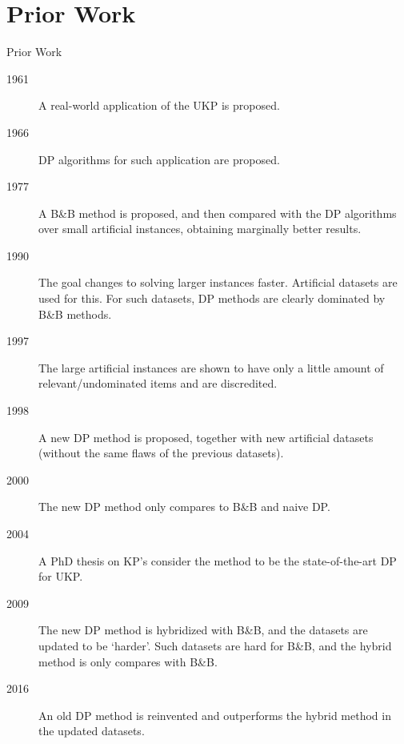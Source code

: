 \documentclass{beamer}
\begin{document}
\section{Prior Work}
\begin{frame}[allowframebreaks]{Prior Work}
\begin{description}
\item[1961] A real-world application of the UKP is proposed.\cite{gg-61} %
\item[1966] DP algorithms for such application are proposed.\cite{gg-66} %
\item[1977] A B\&B method is proposed, and then compared with the DP algorithms over small artificial instances, obtaining marginally better results.\cite{mtu1} %
\item[1990] The goal changes to solving larger instances faster. Artificial datasets are used for this. For such datasets, DP methods are clearly dominated by B\&B methods.\cite{mtu2} %
\item[1997] The large artificial instances are shown to have only a little amount of relevant/undominated items and are discredited.\cite{zhu_dominated} %
\item[1998] A new DP method is proposed, together with new artificial datasets (without the same flaws of the previous datasets).\cite{ukp_new_results} %
\item[2000] The new DP method only compares to B\&B and naive DP.\cite{eduk} %
\item[2004] A PhD thesis on KP's consider the method to be the state-of-the-art DP for UKP.\cite{book_ukp_2004}
\item[2009] The new DP method is hybridized with B\&B, and the datasets are updated to be `harder'. Such datasets are hard for B\&B, and the hybrid method is only compares with B\&B.\cite{pya} %
\item[2016] An old DP method is reinvented and outperforms the hybrid method in the updated datasets.\cite{sea2016}
\end{description}
\end{frame}
\end{document}
